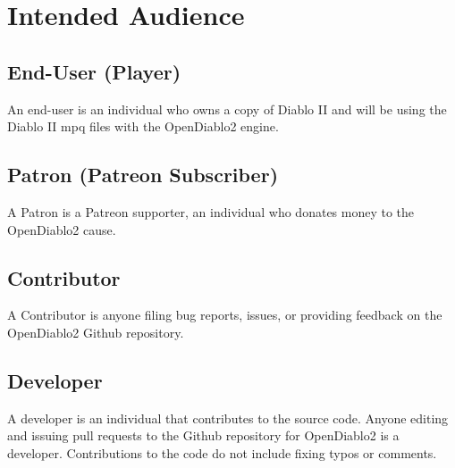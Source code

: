 \section{Intended Audience} \label{sec:audience}


\subsection{End-User (Player)}
An end-user is an individual who owns a copy of Diablo II and will be using the Diablo II mpq files with the OpenDiablo2 engine.

\subsection{Patron (Patreon Subscriber)}
A Patron is a Patreon supporter, an individual who donates money to the OpenDiablo2 cause.

\subsection{Contributor}
A Contributor is anyone filing bug reports, issues, or providing feedback on the OpenDiablo2 Github repository.

\subsection{Developer}
A developer is an individual that contributes to the source code.
Anyone editing and issuing pull requests to the Github repository for OpenDiablo2 is a developer. Contributions to the code do not include fixing typos or comments.

